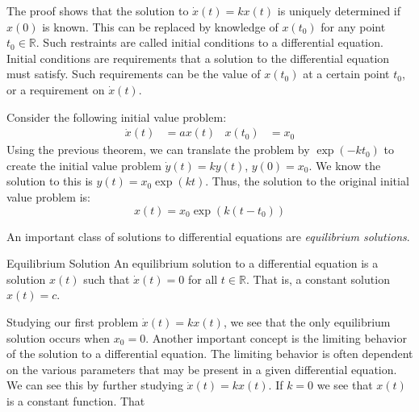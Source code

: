             The proof shows that the solution to $\dot{x}(t)=kx(t)$
            is uniquely determined if $x(0)$ is known. This can
            be replaced by knowledge of $x(t_{0})$ for any point
            $t_{0}\in\mathbb{R}$.
            Such restraints are called initial conditions to a
            differential equation. Initial conditions are
            requirements that a solution to the differential
            equation must satisfy. Such requirements can be
            the value of $x(t_{0})$ at a certain point
            $t_{0}$, or a requirement on $\dot{x}(t)$.
            \begin{fexample}{}{}
                Consider the following initial value problem:
                \begin{align}
                    \dot{x}(t)&=ax(t)
                    &
                    x(t_{0})&=x_{0}
                \end{align}
                Using the previous theorem, we can translate the
                problem by $\exp(-kt_{0})$ to create the initial
                value problem $\dot{y}(t)=ky(t)$, $y(0)=x_{0}$.
                We know the solution to this is
                $y(t)=x_{0}\exp(kt)$. Thus, the solution to the
                original initial value problem is:
                \begin{equation}
                    x(t)=x_{0}\exp(k(t-t_{0}))
                \end{equation}
            \end{fexample}
            An important class of solutions to differential
            equations are \textit{equilibrium solutions}.
            \begin{fdefinition}{Equilibrium Solution}{}
                An equilibrium solution to a differential
                equation is a solution $x(t)$ such that
                $\dot{x}(t)=0$ for all $t\in\mathbb{R}$.
                That is, a constant solution $x(t)=c$.
            \end{fdefinition}
            Studying our first problem $\dot{x}(t)=kx(t)$,
            we see that the only equilibrium solution
            occurs when $x_{0}=0$. Another important concept
            is the limiting behavior of the solution to a
            differential equation. The limiting behavior
            is often dependent on the various parameters that
            may be present in a given differential equation.
            We can see this by further studying $\dot{x}(t)=kx(t)$.
            If $k=0$ we see that $x(t)$ is a constant function. That

